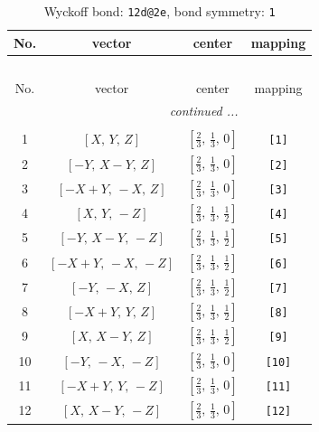\documentclass[fleqn,8pt]{jsarticle}
\begin{document}
\begin{longtable}{cccc}
\caption{Wyckoff bond: {\tt 12d@2e}, bond symmetry: {\tt 1}}
 \\
 \hline \hline
No. & vector & center & mapping \\ \hline \endfirsthead

\multicolumn{3}{l}{\tablename\ \thetable{}} \\
 \hline \hline
No. & vector & center & mapping \\ \hline \endhead

 \hline \hline
\multicolumn{3}{r}{\footnotesize\it continued ...} \\ \endfoot

 \hline \hline
\multicolumn{3}{r}{} \\ \endlastfoot

1 & $\left[ X,\, Y,\, Z \right]$ & $\left[ \frac{2}{3},\, \frac{1}{3},\, 0 \right]$ & {\tt [1]} \\ \hline
2 & $\left[ - Y,\, X - Y,\, Z \right]$ & $\left[ \frac{2}{3},\, \frac{1}{3},\, 0 \right]$ & {\tt [2]} \\ \hline
3 & $\left[ - X + Y,\, - X,\, Z \right]$ & $\left[ \frac{2}{3},\, \frac{1}{3},\, 0 \right]$ & {\tt [3]} \\ \hline
4 & $\left[ X,\, Y,\, - Z \right]$ & $\left[ \frac{2}{3},\, \frac{1}{3},\, \frac{1}{2} \right]$ & {\tt [4]} \\ \hline
5 & $\left[ - Y,\, X - Y,\, - Z \right]$ & $\left[ \frac{2}{3},\, \frac{1}{3},\, \frac{1}{2} \right]$ & {\tt [5]} \\ \hline
6 & $\left[ - X + Y,\, - X,\, - Z \right]$ & $\left[ \frac{2}{3},\, \frac{1}{3},\, \frac{1}{2} \right]$ & {\tt [6]} \\ \hline
7 & $\left[ - Y,\, - X,\, Z \right]$ & $\left[ \frac{2}{3},\, \frac{1}{3},\, \frac{1}{2} \right]$ & {\tt [7]} \\ \hline
8 & $\left[ - X + Y,\, Y,\, Z \right]$ & $\left[ \frac{2}{3},\, \frac{1}{3},\, \frac{1}{2} \right]$ & {\tt [8]} \\ \hline
9 & $\left[ X,\, X - Y,\, Z \right]$ & $\left[ \frac{2}{3},\, \frac{1}{3},\, \frac{1}{2} \right]$ & {\tt [9]} \\ \hline
10 & $\left[ - Y,\, - X,\, - Z \right]$ & $\left[ \frac{2}{3},\, \frac{1}{3},\, 0 \right]$ & {\tt [10]} \\ \hline
11 & $\left[ - X + Y,\, Y,\, - Z \right]$ & $\left[ \frac{2}{3},\, \frac{1}{3},\, 0 \right]$ & {\tt [11]} \\ \hline
12 & $\left[ X,\, X - Y,\, - Z \right]$ & $\left[ \frac{2}{3},\, \frac{1}{3},\, 0 \right]$ & {\tt [12]} \\
\end{longtable}
\end{document}
